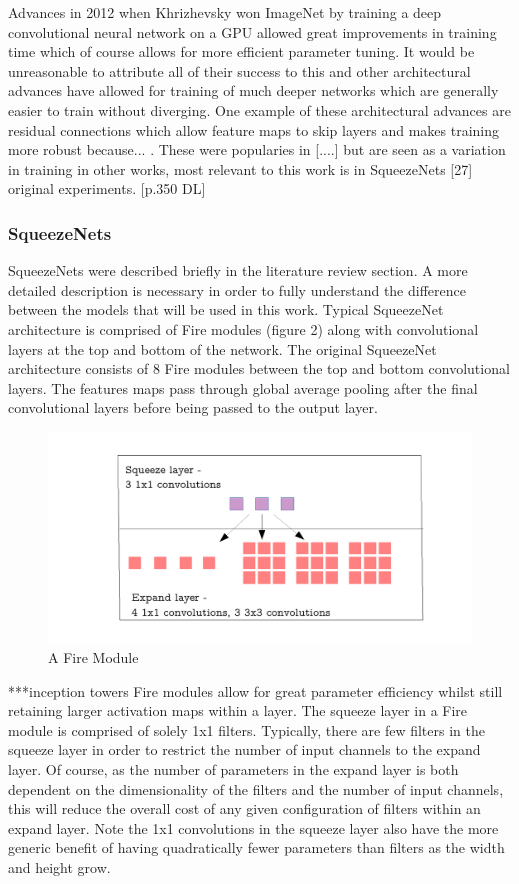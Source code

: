 \documentclass{article}
\begin{document}
Advances in 2012 when Khrizhevsky won ImageNet by training a deep convolutional neural network on a GPU allowed great improvements in training time which of course allows for more efficient parameter tuning. It would be unreasonable to attribute all of their success to this and other architectural advances have allowed for training of much deeper networks which are generally easier to train without diverging. One example of these architectural advances are residual connections which allow feature maps to skip layers and makes training more robust because... . These were popularies in [....] but are seen as a variation in training in other works, most relevant to this work is in SqueezeNets [27] original experiments.
[p.350 DL]

\subsubsection{SqueezeNets}
SqueezeNets were described briefly in the literature review section. A more detailed description is necessary in order to fully understand the difference between the models that will be used in this work. Typical SqueezeNet architecture is comprised of Fire modules (figure 2) along with convolutional layers at the top and bottom of the network. The original SqueezeNet architecture consists of 8 Fire modules between the top and bottom convolutional layers. The features maps pass through global average pooling after the final convolutional layers before being passed to the output layer.\\

\begin{figure}[!b]
  \includegraphics[width=\linewidth]{fire.pdf}
  \caption{A Fire Module}
  \label{fig:dwconvolution}
\end{figure}

***inception towers
Fire modules allow for great parameter efficiency whilst still retaining larger activation maps within a layer. The squeeze layer in a Fire module is comprised of solely 1x1 filters. Typically, there are few filters in the squeeze layer in order to restrict the number of input channels to the expand layer. Of course, as the number of parameters in the expand layer is both dependent on the dimensionality of the filters and the number of input channels, this will reduce the overall cost of any given configuration of filters within an expand layer. Note the 1x1 convolutions in the squeeze layer also have the more generic benefit of having quadratically fewer parameters than filters as the width and height grow. \\
\end{document}
